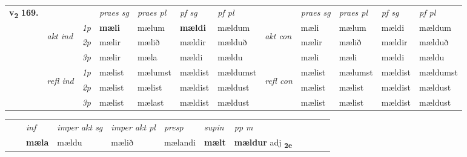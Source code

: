 \begin{tabular}{llllllllllll} \toprule
\multirow{4}{*}{{{\textbf{v{\textsubscript{2}}} \Large{\textbf{169.}}}}}  & &   &  \textit{praes sg}  & \textit{praes pl}  &\textit{ pf sg} & \textit{pf pl} &  &  \textit{praes sg}  & \textit{praes pl}  & \textit{pf sg} & \textit{pf pl } \\*
	\cmidrule{4-7} \cmidrule{9-12}
 & \multirow{3}{*}{\begin{turn}{90}\textit{akt ind}\end{turn}} & {\textit{1p}} & \textbf{mæli} & mælum    & \textbf{mældi} & mældum & \multirow{3}{*}{\begin{turn}{90}\textit{akt con}\end{turn}} &mæli & mælum & mældi & mældum\\*
& &  {\textit{2p}} &  mælir  & mælið   & mældir & mælduð & & mælir & mælið & mældir & mælduð \\*
& &  {\textit{3p}} & mælir & mæla   & mældi & mældu & & mæli & mæli& mældi & mældu  \\*
\cmidrule{4-7} \cmidrule{9-12}
 &\multirow{3}{*}{\begin{turn}{90}\textit{refl ind}\end{turn}} & {\textit{1p}} & mælist & mælumst    & mældist & mældumst & \multirow{3}{*}{\begin{turn}{90}\textit{refl con}\end{turn}}  &mælist & mælumst & mældist & mældumst\\*
 &&  {\textit{2p}} &  mælist  & mælist   & mældist & mældust & &mælist & mælist & mældist & mældust \\*
& &  {\textit{3p}} & mælist & mælast   & mældist & mældust & & mælist & mælist& mældist & mældust  \\*
\cmidrule{4-7} \cmidrule{9-12}
\end{tabular}


\begin{tabular}{llllllllllll}
 & & \textit{inf} & \textit{imper akt sg} & \textit{imper akt pl}   & \textit{presp} & \textit{supin}  & \textit{pp m}     \\*
  & & \textbf{mæla} & mældu  & mælið   & mælandi &  \textbf{mælt}  & \textbf{mældur} adj \textbf{\textsubscript{2e}} \\*
\cmidrule{1-12}
\end{tabular}



